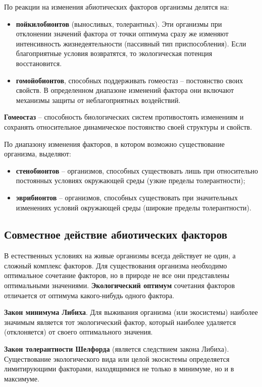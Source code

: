 \documentclass[a5paper, 11pt]{extarticle}
\theoremstyle{definition}
\theoremstyle{definition}
\theoremstyle{definition}
\numberwithin{figure}{section}
\begin{document}
По реакции на изменения абиотических факторов организмы делятся на:
\begin{itemize}
    \item \textbf{пойкилобионтов} (выносливых, толерантных). Эти организмы при отклонении значений фактора от точки оптимума сразу же изменяют интенсивность жизнедеятельности (пассивный тип приспособления). Если благоприятные условия возвратятся, то экологическая потенция восстановится.
    \item \textbf{гомойобионтов}, способных поддерживать гомеостаз -- постоянство своих свойств. В определенном диапазоне изменений фактора они включают механизмы защиты от неблагоприятных воздействий.
\end{itemize}

\textbf{Гомеостаз} -- способность биологических систем противостоять изменениям и сохранять относительное динамическое постоянство своей структуры и свойств.

По диапазону изменения факторов, в котором возможно существование организма, выделяют:
\begin{itemize}
    \item \textbf{стенобионтов} -- организмов, способных существовать лишь при относительно постоянных условиях окружающей среды (узкие пределы толерантности);
    \item \textbf{эврибионтов} -- организмов, способных существовать при значительных изменениях условий окружающей среды (широкие пределы толерантности).
\end{itemize}

\subsection{Совместное действие абиотических факторов}

В естественных условиях на живые организмы всегда действует не один, а сложный комплекс факторов. Для существования организма необходимо оптимальное сочетание факторов, но в природе не все они представлены оптимальными значениями. \textbf{Экологический оптимум} сочетания факторов отличается от оптимума какого-нибудь одного фактора.

\textbf{Закон минимума Либиха}. Для выживания организма (или экосистемы) наиболее значимым является тот экологический фактор, который наиболее удаляется (отклоняется) от своего оптимального значения.

\textbf{Закон толерантности Шелфорда} (является следствием закона Либиха). Существование экологического вида или целой экосистемы определяется лимитирующими факторами, находящимися не только в минимуме, но и в максимуме.
\end{document}

